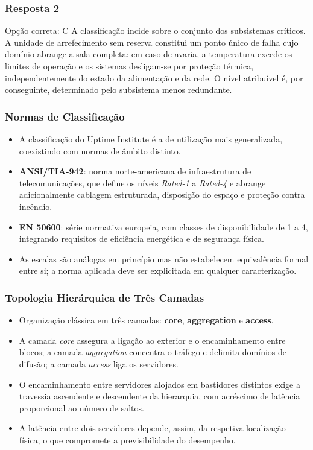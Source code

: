 \documentclass[aspectratio=169]{beamer}
\begin{document}
\begin{frame}
\frametitle{Resposta 2}
\begin{resposta}{Opção correta: C}
A classificação incide sobre o conjunto dos subsistemas críticos. A unidade de arrefecimento sem reserva constitui um ponto único de falha cujo domínio abrange a sala completa: em caso de avaria, a temperatura excede os limites de operação e os sistemas desligam-se por proteção térmica, independentemente do estado da alimentação e da rede. O nível atribuível é, por conseguinte, determinado pelo subsistema menos redundante.
\end{resposta}
\end{frame}

\begin{frame}
\frametitle{Normas de Classificação}
\begin{itemize}
    \setlength\itemsep{0.35cm}
    \item A classificação do Uptime Institute é a de utilização mais generalizada, coexistindo com normas de âmbito distinto.
    \item \textbf{ANSI/TIA-942}: norma norte-americana de infraestrutura de telecomunicações, que define os níveis \emph{Rated-1} a \emph{Rated-4} e abrange adicionalmente cablagem estruturada, disposição do espaço e proteção contra incêndio.
    \item \textbf{EN 50600}: série normativa europeia, com classes de disponibilidade de 1 a 4, integrando requisitos de eficiência energética e de segurança física.
    \item As escalas são análogas em princípio mas não estabelecem equivalência formal entre si; a norma aplicada deve ser explicitada em qualquer caracterização.
\end{itemize}
\end{frame}

\begin{frame}
\frametitle{Topologia Hierárquica de Três Camadas}
\begin{itemize}
    \setlength\itemsep{0.4cm}
    \item Organização clássica em três camadas: \textbf{core}, \textbf{aggregation} e \textbf{access}.
    \item A camada \emph{core} assegura a ligação ao exterior e o encaminhamento entre blocos; a camada \emph{aggregation} concentra o tráfego e delimita domínios de difusão; a camada \emph{access} liga os servidores.
    \item O encaminhamento entre servidores alojados em bastidores distintos exige a travessia ascendente e descendente da hierarquia, com acréscimo de latência proporcional ao número de saltos.
    \item A latência entre dois servidores depende, assim, da respetiva localização física, o que compromete a previsibilidade do desempenho.
\end{itemize}
\end{frame}
\end{document}
